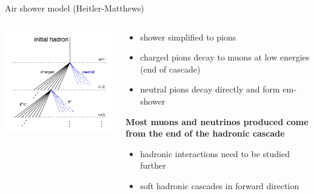 \documentclass[aspectratio=1610, 9pt]{beamer}
\begin{document}
\begin{frame}{Air shower model (Heitler-Matthews)}
  \begin{columns}
    \begin{column}[c]{0.48\textwidth}
      \includegraphics[width=\textwidth]{HM_model.png}
    \end{column}
    \begin{column}[c]{0.48\textwidth}
      \begin{itemize}
        \item shower simplified to pions
        \item charged pions decay to muons at low energies (end of cascade)
        \item neutral pions decay directly and form em-shower
      \end{itemize}
      \textbf{Most muons and neutrinos produced come from the end of the hadronic cascade}
      \begin{itemize}
        \item hadronic interactions need to be studied further
        \item soft hadronic cascades in forward direction
      \end{itemize}
    \end{column}
  \end{columns}
\end{frame}
\end{document}
